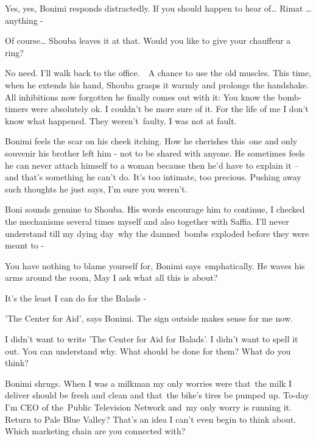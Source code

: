 \documentclass[letterpaper]{article}
\begin{document}
{\textquotedbl}Yes, yes,{\textquotedbl} Bonimi responds distractedly. {\textquotedbl}If you should happen to hear
of{\dots} Rimat {\dots} anything -{\textquotedbl}\ 

{\textquotedbl}Of course\textcolor[rgb]{0.0,0.4392157,0.7529412}{{\dots}}{\textquotedbl} Shouba leaves it at that.
{\textquotedbl}Would you like to give your chauffeur a ring?{\textquotedbl}

{\textquotedbl}No need. I'll walk back to the office.\ \ A chance to use the old muscles.{\textquotedbl} This time, when
he extends his hand, Shouba grasps it warmly and prolongs the handshake. All inhibitions now forgotten he finally comes
out with it: {\textquotedbl}You know the bomb-timers were absolutely ok. I couldn't be more sure of it. For the life of
me I don't know what happened. They weren't~faulty. I was not at fault.{\textquotedbl}

Bonimi feels the scar on his cheek itching. How he cherishes this~one and only souvenir his brother left him - not to be
shared with anyone. He sometimes feels he can never attach himself to a woman because then he'd have to explain it --
and that's something he can't do. It's too intimate, too precious. Pushing away such thoughts he just says,
{\textquotedbl}I'm sure you weren't.{\textquotedbl}

Boni sounds genuine to Shouba. His words encourage him to continue, {\textquotedbl}I checked the mechanisms several
times myself and also together with Saffia. I'll never understand till my dying
day\textcolor[rgb]{0.0,0.4392157,0.7529412}{\ }why the damned\textcolor[rgb]{0.0,0.4392157,0.7529412}{\ }bombs exploded
before they were meant to -{\textquotedbl}\ 

{\textquotedbl}You have nothing to blame yourself for,{\textquotedbl} Bonimi says~emphatically. He waves his arms around
the room, {\textquotedbl}May I ask what all this is about?{\textquotedbl}

{\textquotedbl}It's the least I can do for the Balads -{\textquotedbl}

{\textquotedbl}'The Center for Aid',{\textquotedbl} says Bonimi. {\textquotedbl}The sign outside makes sense for me
now.{\textquotedbl}

{\textquotedbl}I didn't want to write 'The Center for Aid for Balads'. I didn't want to spell it out. You can understand
why. What should be done for them? What do you think?{\textquotedbl}

Bonimi shrugs. {\textquotedbl}When I was a milkman my only worries were that~the milk I deliver should be fresh and
clean and that~the bike's tires be pumped up. To-day I'm CEO of the~Public Television Network and~my only worry is
running it.~ Return to Pale Blue Valley? That's an idea I can't even begin to think about. Which marketing chain are
you connected with?{\textquotedbl}\ 
\end{document}
